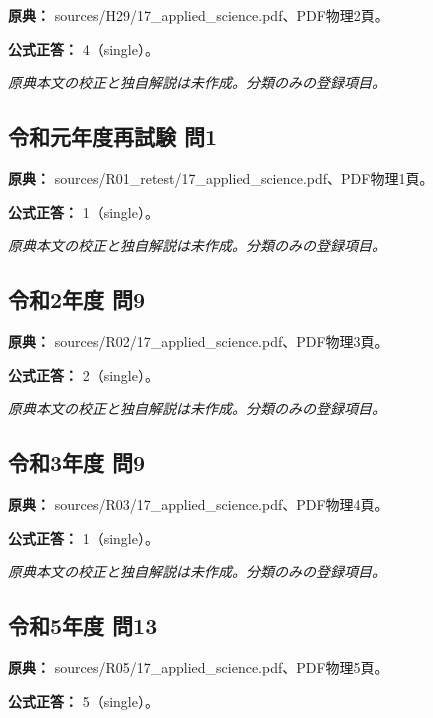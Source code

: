 \noindent\textbf{原典：} sources/H29/17\_applied\_science.pdf、PDF物理2頁。

\textbf{公式正答：} 4（single）。

\par\textit{原典本文の校正と独自解説は未作成。分類のみの登録項目。}

\subsection{令和元年度再試験 問1}
\label{q:r01-ret-applied-01}

\noindent\textbf{原典：} sources/R01\_retest/17\_applied\_science.pdf、PDF物理1頁。

\textbf{公式正答：} 1（single）。

\par\textit{原典本文の校正と独自解説は未作成。分類のみの登録項目。}

\subsection{令和2年度 問9}
\label{q:r02-reg-applied-09}

\noindent\textbf{原典：} sources/R02/17\_applied\_science.pdf、PDF物理3頁。

\textbf{公式正答：} 2（single）。

\par\textit{原典本文の校正と独自解説は未作成。分類のみの登録項目。}

\subsection{令和3年度 問9}
\label{q:r03-reg-applied-09}

\noindent\textbf{原典：} sources/R03/17\_applied\_science.pdf、PDF物理4頁。

\textbf{公式正答：} 1（single）。

\par\textit{原典本文の校正と独自解説は未作成。分類のみの登録項目。}

\subsection{令和5年度 問13}
\label{q:r05-reg-applied-13}

\noindent\textbf{原典：} sources/R05/17\_applied\_science.pdf、PDF物理5頁。

\textbf{公式正答：} 5（single）。

